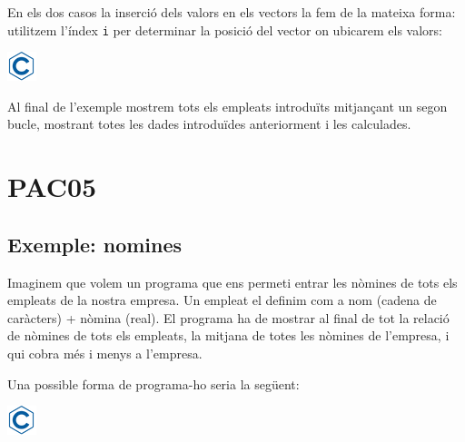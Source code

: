 \documentclass[]{book}
\newenvironment{Shaded}{\begin{snugshade}}{\end{snugshade}}
\newcommand{\StringTok}[1]{\textcolor[rgb]{0.31,0.60,0.02}{#1}}
\newcommand{\CommentTok}[1]{\textcolor[rgb]{0.56,0.35,0.01}{\textit{#1}}}
\newcommand{\NormalTok}[1]{#1}
\begin{document}
En els dos casos la inserció dels valors en els vectors la fem de la
mateixa forma: utilitzem l'índex \texttt{i} per determinar la posició
del vector on ubicarem els valors:

\includegraphics{./img/c.png}

\begin{Shaded}
\end{Shaded}

Al final de l'exemple mostrem tots els empleats introduïts mitjançant un
segon bucle, mostrant totes les dades introduïdes anteriorment i les
calculades.

\chapter{PAC05}\label{pac05}

\section{Exemple: nomines}\label{exemple-nomines}

Imaginem que volem un programa que ens permeti entrar les nòmines de
tots els empleats de la nostra empresa. Un empleat el definim com a nom
(cadena de caràcters) + nòmina (real). El programa ha de mostrar al
final de tot la relació de nòmines de tots els empleats, la mitjana de
totes les nòmines de l'empresa, i qui cobra més i menys a l'empresa.

Una possible forma de programa-ho seria la següent:

\includegraphics{./img/c.png}
\end{document}
